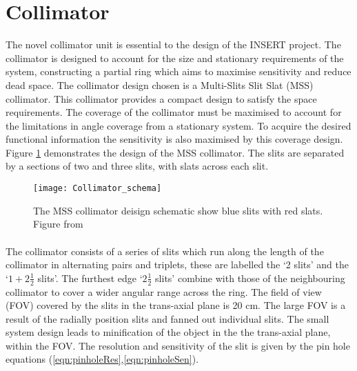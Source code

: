 \section{Collimator}
The novel collimator unit is essential to the design of the INSERT project. The collimator is designed to account for the size and stationary requirements of the system, constructing a partial ring which aims to maximise sensitivity and reduce dead space. The collimator design chosen is a Multi-Slits Slit Slat (MSS) collimator. This collimator provides a compact design to satisfy the space requirements. The coverage of the collimator must be maximised to account for the limitations in angle coverage from a stationary system. To acquire the desired functional information the sensitivity is also maximised by this coverage design. Figure \ref{fig:MSSColl} demonstrates the design of the MSS collimator. The slits are separated by a sections of two and three slits, with slats across each slit.

\begin{figure}[htp]
    \centering
    \texttt{[image: Collimator\_schema]} %
    \caption{The MSS collimator deisign schematic show blue slits with red slats. Figure from \cite{8069508}} \label{fig:MSSColl}
\end{figure}

\paragraph{}
The collimator consists of a series of slits which run along the length of the collimator in alternating pairs and triplets, these are labelled the `2 slits' and the `$1 + 2\frac{1}{2}$ slits'. The furthest edge `$2\frac{1}{2}$ slits'  combine with those of the neighbouring collimator to cover a wider angular range across the ring. The field of view (FOV) covered by the slits in the trans-axial plane is 20 cm. The large FOV is a result of the radially position slits and fanned out individual slits. The small system design leads to minification of the object in the the trans-axial plane, within the FOV. The resolution and sensitivity of the slit is given by the pin hole equations (\ref{eqn:pinholeRes},\ref{eqn:pinholeSen}).
